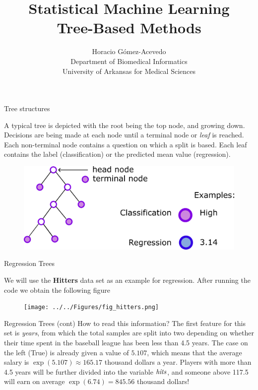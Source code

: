 \documentclass{beamer}
\title{Statistical Machine Learning\\ 
Tree-Based Methods}
\author{Horacio G\'omez-Acevedo\\ Department of Biomedical Informatics\\
University of Arkansas for Medical Sciences}
\begin{document}
	\begin{frame}[plain]
		\maketitle
	\end{frame}
	
	
	\begin{frame}{Tree structures}
		
		A typical tree is depicted with the root being the top node, and growing down. Decisions are being made at each node until a terminal node or {\it leaf} is reached. Each non-terminal node contains a question on which a split is based. Each leaf contains the label (classification) or the predicted mean value (regression).
		
\begin{figure}[h]
	\centering
	\includegraphics{../../Figures/fig_tree_terminology.png}
\end{figure}		
		 
		
		
\end{frame}

\begin{frame}{Regression Trees}

We will use the {\bf Hitters} data set as an example for  regression.  After running the code we obtain the following figure

\begin{figure}[h]
	\centering
	\texttt{[image: ../../Figures/fig\_hitters.png]}
\end{figure}
	
	
\end{frame}

\begin{frame}{Regression Trees (cont)}
	How to read this information?
	The first feature for this set is {\it years}, from which the total samples are split into two depending on whether their time spent in the baseball league has been less than 4.5 years. The case on the left (True) is already given a value of $5.107$, which means that the average salary is $\exp(5.107)\approx 165.17$ thousand dollars a year. Players with more than 4.5 years will be further divided into the variable ${\it hits} $, and someone above 117.5 will earn on average $\exp(6.74)=845.56$ thousand dollars!
\end{frame}
\end{document}
